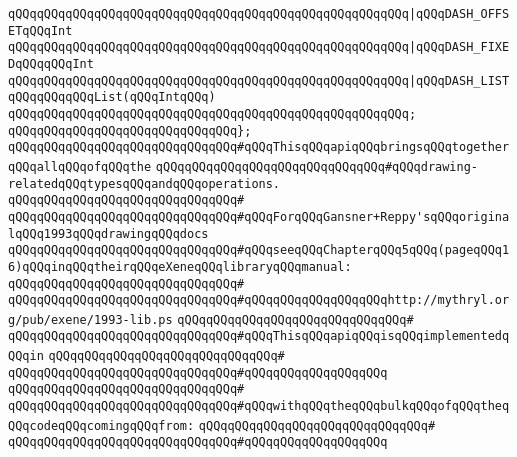 \verb|qQQqqQQqqQQqqQQqqQQqqQQqqQQqqQQqqQQqqQQqqQQqqQQqqQQqqQQq|\verb#|qQQqDASH_OFFSETqQQqInt#\newline
\verb|qQQqqQQqqQQqqQQqqQQqqQQqqQQqqQQqqQQqqQQqqQQqqQQqqQQqqQQq|\verb#|qQQqDASH_FIXEDqQQqqQQqInt#\newline
\verb|qQQqqQQqqQQqqQQqqQQqqQQqqQQqqQQqqQQqqQQqqQQqqQQqqQQqqQQq|\verb#|qQQqDASH_LISTqQQqqQQqqQQqList(qQQqIntqQQq)#\newline
\verb|qQQqqQQqqQQqqQQqqQQqqQQqqQQqqQQqqQQqqQQqqQQqqQQqqQQqqQQq;|\newline
\verb|qQQqqQQqqQQqqQQqqQQqqQQqqQQqqQQq};|\newline
\newline
\verb|qQQqqQQqqQQqqQQqqQQqqQQqqQQqqQQq#qQQqThisqQQqapiqQQqbringsqQQqtogetherqQQqallqQQqofqQQqthe|\newline
\verb|qQQqqQQqqQQqqQQqqQQqqQQqqQQqqQQq#qQQqdrawing-relatedqQQqtypesqQQqandqQQqoperations.|\newline
\verb|qQQqqQQqqQQqqQQqqQQqqQQqqQQqqQQq#|\newline
\verb|qQQqqQQqqQQqqQQqqQQqqQQqqQQqqQQq#qQQqForqQQqGansner+Reppy'sqQQqoriginalqQQq1993qQQqdrawingqQQqdocs|\newline
\verb|qQQqqQQqqQQqqQQqqQQqqQQqqQQqqQQq#qQQqseeqQQqChapterqQQq5qQQq(pageqQQq16)qQQqinqQQqtheirqQQqeXeneqQQqlibraryqQQqmanual:|\newline
\verb|qQQqqQQqqQQqqQQqqQQqqQQqqQQqqQQq#|\newline
\verb|qQQqqQQqqQQqqQQqqQQqqQQqqQQqqQQq#qQQqqQQqqQQqqQQqqQQqhttp://mythryl.org/pub/exene/1993-lib.ps|\newline
\verb|qQQqqQQqqQQqqQQqqQQqqQQqqQQqqQQq#|\newline
\newline
\verb|qQQqqQQqqQQqqQQqqQQqqQQqqQQqqQQq#qQQqThisqQQqapiqQQqisqQQqimplementedqQQqin|\newline
\verb|qQQqqQQqqQQqqQQqqQQqqQQqqQQqqQQq#|\newline
\verb|qQQqqQQqqQQqqQQqqQQqqQQqqQQqqQQq#qQQqqQQqqQQqqQQqqQQq|\newline
\verb|qQQqqQQqqQQqqQQqqQQqqQQqqQQqqQQq#|\newline
\verb|qQQqqQQqqQQqqQQqqQQqqQQqqQQqqQQq#qQQqwithqQQqtheqQQqbulkqQQqofqQQqtheqQQqcodeqQQqcomingqQQqfrom:|\newline
\verb|qQQqqQQqqQQqqQQqqQQqqQQqqQQqqQQq#|\newline
\verb|qQQqqQQqqQQqqQQqqQQqqQQqqQQqqQQq#qQQqqQQqqQQqqQQqqQQq|\newline
